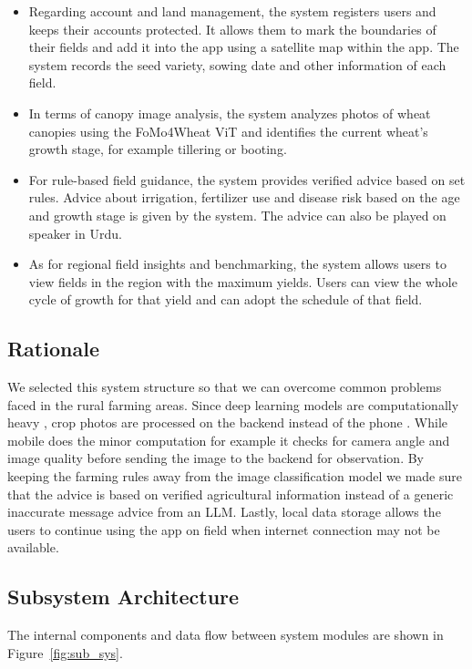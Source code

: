 \documentclass{FastFyp}
\begin{document}
\begin{itemize}
	\item Regarding account and land management, the system registers users and keeps
	their accounts protected. It allows them to mark the boundaries of their
	fields and add it into the app using a satellite map within the app. The
	system records the seed variety, sowing date and other information of each
	field.
	
	\item In terms of canopy image analysis, the system analyzes photos of wheat
	canopies using the FoMo4Wheat ViT and identifies the current
	wheat's growth stage, for example tillering or booting.
	
	\item For rule-based field guidance, the system provides verified advice based on
	set rules. Advice about irrigation, fertilizer use and disease risk based on
	the age and growth stage is given by the system. The advice can also be played
	on speaker in Urdu.
	
	\item As for regional field insights and benchmarking, the system allows users
	to view fields in the region with the maximum yields. Users can view the
	whole cycle of growth for that yield and can adopt the schedule of that field.
\end{itemize}

\subsection{Rationale}

We selected this system structure so that we can overcome common problems faced in the rural farming areas. Since deep learning models are computationally heavy , crop photos are processed on the backend instead of the phone . While mobile does the minor computation for example it checks for camera angle and image quality before sending the image to the backend for observation. By keeping the farming rules away from the image classification model we made sure that the advice is based on verified agricultural information instead of a generic inaccurate message advice from an LLM. Lastly, local data storage allows the users to continue using the app on field when internet connection may not be available.

 
\clearpage
\subsection{Subsystem Architecture}
The internal components and data flow between system modules are shown in Figure~\ref{fig:sub_sys}.
\end{document}
